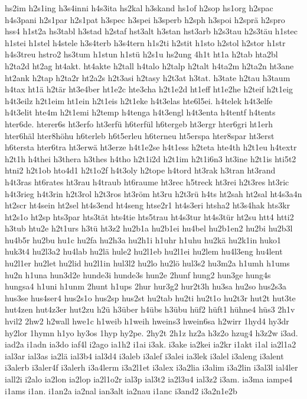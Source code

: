 {hs2im
h2s1ing
h3s4inni
h4s3ita
hs2kal
h3skand
hs1of
h2sop
hs1org
h2spac
h4s3pani
h2s1par
h2s1pat
h3spec
h3spei
h3sperb
h2sph
h3spoi
h2sprä
h2spro
hss4
h1st2a
hs3tabl
h3stad
h2staf
hst3alt
h3stan
hst3arb
h2s3tau
h2s3täu
h1stec
h1stei
h1stel
h4stele
h3s4terb
h3s4tern
h1s2ti
h2stit
h1sto
h2stol
h2stor
h1str
h4s3treu
hstro2
hs3tum
h1stun
h1stü
h2s1u
hs2ung
4h1t
ht1a
h2tab
hta2bl
h2ta2d
ht2ag
ht4akt.
ht4akte
h2tall
h4talo
h2talp
h2talt
h4ta2m
h2ta2n
ht3ane
ht2ank
h2tap
h2ta2r
ht2a2s
h2t3asi
h2tasy
h2t3at
h3tat.
h3tate
h2tau
h3taum
h4tax
ht1ä
h2tär
ht3e4ber
ht1e2c
hte3cha
h2t1e2d
ht1eff
ht1e2he
h2teif
h2t1eig
h4t3eilz
h2t1eim
ht1ein
h2t1eis
h2t1eke
h4t3elas
hte6l5ei.
h4telek
h4t3elfe
h4t3elit
hte4m
h2t1emi
h2temp
h4tenga
h4t3engl
h4t3enta
h4tentf
h4tents
hter6de.
hterer6s
ht3erfo
ht3erfü
h6terfül
h6tergeb
ht3ergr
hter6gri
ht1erh
hter6häl
hter8höhu
h6terleb
h6t5erleu
h6terneu
ht5erspa
hter8spar
ht3erst
h6tersta
hter6tra
ht3erwä
ht3erze
h4t1e2se
h4t1ess
h2teta
hte4th
h2t1eu
h4textr
h2t1h
h4thei
h3thera
h3thes
h4tho
h2t1i2d
h2t1im
h2t1i6n3
ht3ine
h2t1is
hti5t2
htni2
h2t1ob
hto4d1
h2t1o2f
h4t3oly
h2tope
h4tord
ht3rak
h3tran
ht3rand
h4t3ras
ht6rates
ht3rau
h4traub
ht6raume
ht3rec
h5treck
ht3rei
h2t3res
ht3ric
h4t3rieg
h4t3rin
h2t3rol
h2t3ros
ht3röm
ht3ru
h2t3rü
h4ts
ht2sah
ht2sal
ht4s3a4n
ht2scr
ht4sein
ht2sel
ht4s3end
ht4seng
htse2r1
ht4s3eri
htsha2
ht3s4hak
hts3kr
ht2s1o
ht2sp
hts3par
hts3tät
hts4tie
hts5trau
ht4s3tur
ht4s3tür
ht2su
htt4
htti2
h3tub
htu2e
h2t1urs
h3tü
ht3z2
hu2b1a
hu2b1ei
hu4bel
hu2b1en2
hu2bi
hu2b3l
hu4b5r
hu2bu
hu1c
hu2fa
hu2h3a
hu2h1i
h1uhr
h1uhu
hu2kä
hu2k1in
huko1
huk3t4
hu2l3a2
hu4lab
hu2lä
hule2
hu2l1eb
hu2l1ei
hu2lem
hu4l3eng
hu4lent
hu2l1er
hu2let
hu2lid
hu2l1in
hul3l2
hu2lo
hu2lö
hul3s2
hu3m2a
h1umh
h1ums
hu2n
h1una
hun3d2e
hunde3i
hunde3s
hun2e
2hunf
hung2
hun3ge
hung4s
hungsa4
h1uni
h1unm
2hunt
h1ups
2hur
hur3g2
hur2t3h
hu3sa
hu2so
hus2s3a
hus3se
hus4ser4
hus2s1o
hus2sp
hus2st
hu2tab
hu2ti
hu2t1o
hu2t3r
hut2t
hut3te
hut4zen
hut4z3er
hut2zu
h2ü
h3über
h4übs
h3übu
hüf2
hüft1
hühne4
hüs3
2h1v
hvil2
2hw2
h2wall
hwe1c
h1weib
h1weih
hweins3
hwein6sa
h2wirr
1hyd4
hy3dr
hy2lor
1hymn
h1yo
hy3os
1hyp
hy2pe.
2hy2t
2h1z
hz2a
h3z2o
hzug4
h3z2w
i3ad.
iad2a
i1adn
ia3do
iaf4l
i2ago
ia1h2
i1ai
i3ak.
i3ake
ia2kei
ia2kr
i1akt
i1al
ia2l1a2
ial3ar
ial3as
ia2lä
ial3b4
ial3d4
i3aleb
i3alef
i3alei
ia3lek
i3alel
i3aleng
i3alent
i3alerb
i3aler4f
i3alerh
i3a4lerm
i3a2l1et
i3alex
i3a2lia
i3alim
i3a2lin
i3al3l
ial4ler
iall2i
i2alo
ia2lon
ia2lop
ia2l1o2r
ial3p
ial3t2
ia2l3u4
ial3z2
i3am.
ia3ma
iampe4
i1ams
i1an.
i1an2a
ia2nal
ian3alt
ia2nau
i1anc
i3and2
i3a2n1e2b
}
